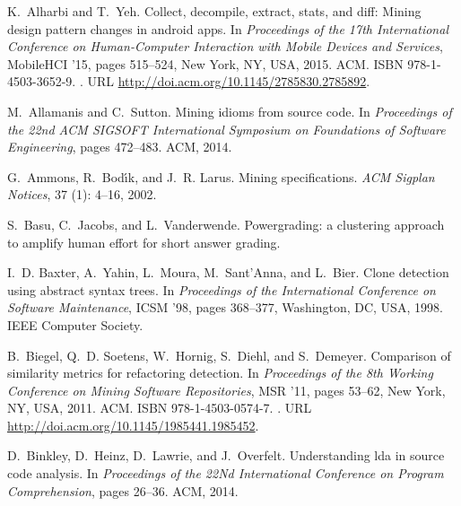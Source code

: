\documentclass[12pt,twoside]{mitthesis}
\providecommand{\DIFaddtex}[1]{{\protect\color{blue}\uwave{#1}}} %
\providecommand{\DIFaddbegin}{} %
\providecommand{\DIFaddend}{} %
\providecommand{\DIFdelbegin}{} %
\providecommand{\DIFdelend}{} %
\providecommand{\DIFadd}[1]{\texorpdfstring{\DIFaddtex{#1}}{#1}} %
\begin{document}
{{{{{{{{{{\begin{thebibliography}{135}
K.~Alharbi and T.~Yeh.
\newblock Collect, decompile, extract, stats, and diff: Mining design pattern
  changes in android apps.
\newblock In \emph{Proceedings of the 17th International Conference on
  Human-Computer Interaction with Mobile Devices and Services}, MobileHCI '15,
  pages 515--524, New York, NY, USA, 2015. ACM.
\newblock ISBN 978-1-4503-3652-9.
\newblock {}.
\newblock URL \url{http://doi.acm.org/10.1145/2785830.2785892}.

M.~Allamanis and C.~Sutton.
\newblock Mining idioms from source code.
\newblock In \emph{Proceedings of the 22nd ACM SIGSOFT International Symposium
  on Foundations of Software Engineering}, pages 472--483. ACM, 2014.

G.~Ammons, R.~Bod{\'\i}k, and J.~R. Larus.
\newblock Mining specifications.
\newblock \emph{ACM Sigplan Notices}, 37 (1): 4--16, 2002.

\DIFdelbegin %
\DIFdelend \DIFaddbegin {}
\DIFaddend S.~Basu, C.~Jacobs, and L.~Vanderwende.
\newblock Powergrading: a clustering approach to amplify human effort for short
  answer grading.
\DIFaddbegin \newblock \emph{\DIFadd{TACL}}\DIFadd{, 1:} \DIFadd{391--402, 2013.
}\DIFaddend 

I.~D. Baxter, A.~Yahin, L.~Moura, M.~Sant'Anna, and L.~Bier.
\newblock Clone detection using abstract syntax trees.
\newblock In \emph{Proceedings of the International Conference on Software
  Maintenance}, ICSM '98, pages 368--377, Washington, DC, USA, 1998. IEEE
  Computer Society.

B.~Biegel, Q.~D. Soetens, W.~Hornig, S.~Diehl, and S.~Demeyer.
\newblock Comparison of similarity metrics for refactoring detection.
\newblock In \emph{Proceedings of the 8th Working Conference on Mining Software
  Repositories}, MSR '11, pages 53--62, New York, NY, USA, 2011. ACM.
\newblock ISBN 978-1-4503-0574-7.
\newblock {}.
\newblock URL \url{http://doi.acm.org/10.1145/1985441.1985452}.

D.~Binkley, D.~Heinz, D.~Lawrie, and J.~Overfelt.
\newblock Understanding lda in source code analysis.
\newblock In \emph{Proceedings of the 22Nd International Conference on Program
  Comprehension}, pages 26--36. ACM, 2014.


\end{thebibliography}}}}}}}}}}}
\end{document}

